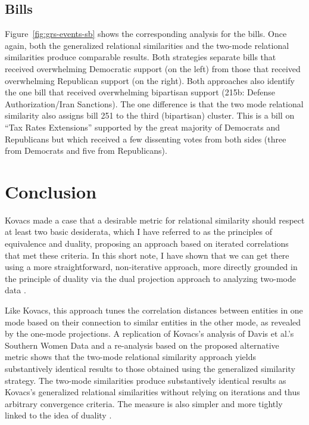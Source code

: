 \documentclass[a4paper,fleqn]{cas-sc}
\begin{document}
\subsection{Bills}
Figure~\ref{fig:grs-events-sb} shows the corresponding analysis for the bills. Once again, both the generalized relational similarities and the two-mode relational similarities produce comparable results. Both strategies separate bills that received overwhelming Democratic support (on the left) from those that received overwhelming Republican support (on the right). Both approaches also identify the one bill that received overwhelming bipartisan support (215b: Defense Authorization/Iran Sanctions). The one difference is that the two mode relational similarity also assigns bill 251 to the third (bipartisan) cluster. This is a bill on ``Tax Rates Extensions'' supported by the great majority of Democrats and Republicans but which received a few dissenting votes from both sides (three from Democrats and five from Republicans). 

\section{Conclusion}
Kovacs \citeyearpar{kovacs2010} made a case that a desirable metric for relational similarity should respect at least two basic desiderata, which I have referred to as the principles of equivalence and duality, proposing an approach based on iterated correlations that met these criteria. In this short note, I have shown that we can get there using a more straightforward, non-iterative approach, more directly grounded in the principle of duality via the dual projection approach to analyzing two-mode data \citep{everett2013}. 

Like Kovacs, this approach tunes the correlation distances between entities in one mode based on their connection to similar entities in the other mode, as revealed by the one-mode projections. A replication of Kovacs's analysis of Davis et al.'s \citeyearpar{davis1941} Southern Women Data and a re-analysis based on the proposed alternative metric shows that the two-mode relational similarity approach yields substantively identical results to those obtained using the generalized similarity strategy. The two-mode similarities produce substantively identical results as Kovacs's generalized relational similarities without relying on iterations and thus arbitrary convergence criteria. The measure is also simpler and more tightly linked to the idea of duality \citep{breiger1974}. 
\end{document}
